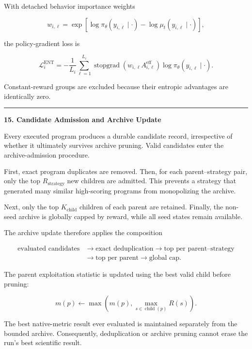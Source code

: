 \documentclass[
]{article}
\begin{document}
With detached behavior importance weights

\[
w_{i,\ell}
=
\exp\left[
\log\pi_\theta(y_{i,\ell}\mid\cdot)
-
\log\mu_t(y_{i,\ell}\mid\cdot)
\right],
\]

the policy-gradient loss is

\[
\mathcal L_i^{\mathrm{ENT}}
=
-\frac{1}{L_i}
\sum_{\ell=1}^{L_i}
\operatorname{stopgrad}
\left(
w_{i,\ell}A_{i,\ell}^{\mathrm{eff}}
\right)
\log\pi_\theta(y_{i,\ell}\mid\cdot).
\]

Constant-reward groups are excluded because their entropic advantages
are identically zero.

\begin{center}\rule{0.5\linewidth}{0.5pt}\end{center}

\textbf{15. Candidate Admission and Archive Update}

Every executed program produces a durable candidate record, irrespective
of whether it ultimately survives archive pruning. Valid candidates
enter the archive-admission procedure.

First, exact program duplicates are removed. Then, for each
parent--strategy pair, only the top \(R_{\mathrm{strategy}}\) new
children are admitted. This prevents a strategy that generated many
similar high-scoring programs from monopolizing the archive.

Next, only the top \(K_{\mathrm{child}}\) children of each parent are
retained. Finally, the non-seed archive is globally capped by reward,
while all seed states remain available.

The archive update therefore applies the composition

\[
\begin{aligned}
\text{evaluated candidates}
&\rightarrow \text{exact deduplication}
\rightarrow \text{top per parent–strategy} \\
&\rightarrow \text{top per parent}
\rightarrow \text{global cap}.
\end{aligned}
\]

The parent exploitation statistic is updated using the best valid child
before pruning:

\[
m(p)
\leftarrow
\max\left(
m(p),
\max_{s\in\operatorname{child}(p)}R(s)
\right).
\]

The best native-metric result ever evaluated is maintained separately
from the bounded archive. Consequently, deduplication or archive pruning
cannot erase the run's best scientific result.
\end{document}
